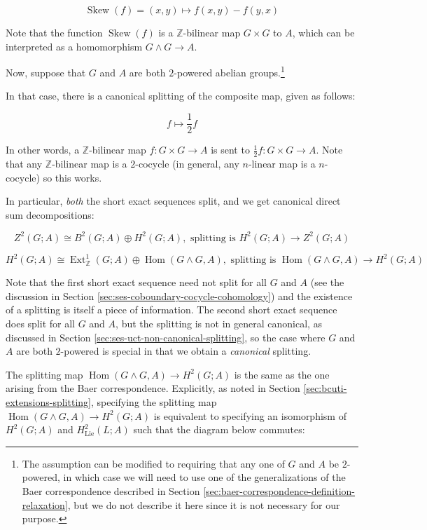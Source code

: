 \documentclass[10pt]{amsart}
\begin{document}
$$\operatorname{Skew}(f) = (x,y) \mapsto f(x,y) - f(y,x)$$

Note that the function $\operatorname{Skew}(f)$ is a
$\mathbb{Z}$-bilinear map $G \times G$ to $A$, which can be
interpreted as a homomorphism $G \wedge G \to A$.

Now, suppose that $G$ and $A$ are both $2$-powered abelian
groups.\footnote{The assumption can be modified to requiring that any
  one of $G$ and $A$ be $2$-powered, in which case we will need to use
  one of the generalizations of the Baer correspondence described in
  Section \ref{sec:baer-correspondence-definition-relaxation}, but we
  do not describe it here since it is not necessary for our purpose.}

In that case, there is a canonical splitting of the composite map,
given as follows:

$$f \mapsto \frac{1}{2}f$$

In other words, a $\mathbb{Z}$-bilinear map $f: G \times G \to A$ is
sent to $\frac{1}{2}f:G \times G \to A$. Note that any
$\mathbb{Z}$-bilinear map is a $2$-cocycle (in general, any $n$-linear
map is a $n$-cocycle) so this works.

In particular, {\em both} the short exact sequences split, and we get
canonical direct sum decompositions:

$$Z^2(G;A) \cong B^2(G;A) \oplus H^2(G;A), \text{ splitting is } H^2(G;A) \to Z^2(G;A)$$

$$H^2(G;A) \cong \operatorname{Ext}^1_{\mathbb{Z}}(G;A) \oplus \operatorname{Hom}(G \wedge G,A), \text{ splitting is } \operatorname{Hom}(G \wedge G,A) \to H^2(G;A)$$

Note that the first short exact sequence need not split for all $G$
and $A$ (see the discussion in Section
\ref{sec:ses-coboundary-cocycle-cohomology}) and the existence of a
splitting is itself a piece of information. The second short exact
sequence does split for all $G$ and $A$, but the splitting is not in
general canonical, as discussed in Section
\ref{sec:ses-uct-non-canonical-splitting}, so the case where $G$ and
$A$ are both $2$-powered is special in that we obtain a {\em
  canonical} splitting.

The splitting map $\operatorname{Hom}(G\wedge G,A) \to H^2(G;A)$ is
the same as the one arising from the Baer correspondence. Explicitly,
as noted in Section \ref{sec:bcuti-extensions-splitting}, specifying the
splitting map $\operatorname{Hom}(G \wedge G, A) \to H^2(G;A)$ is
equivalent to specifying an isomorphism of $H^2(G;A)$ and
$H^2_{\text{Lie}}(L;A)$ such that the diagram below commutes:
\end{document}
